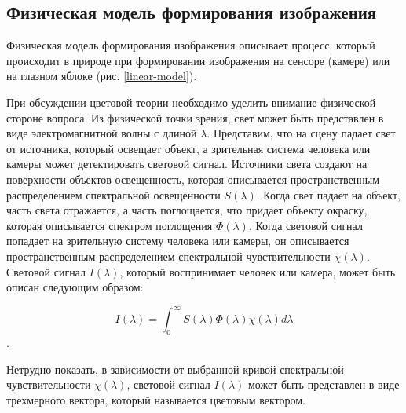 \subsection{Физическая модель формирования изображения}\label{sect-1-1}

Физическая модель формирования изображения \cite{lib-maximov} описывает процесс, который происходит в природе при формировании изображения на сенсоре (камере) или на глазном яблоке (рис. \ref{linear-model}).


При обсуждении цветовой теории необходимо уделить внимание физической стороне вопроса. Из физической точки зрения, свет может быть представлен в виде электромагнитной волны с длиной $\lambda$. Представим, что на сцену падает свет от источника, который освещает объект, а зрительная система человека или камеры может детектировать световой сигнал. Источники света создают на поверхности объектов освещенность, которая описывается пространственным распределением спектральной освещенности $S(\lambda)$. Когда свет падает на объект, часть света отражается, а часть поглощается, что придает объекту окраску, которая описывается спектром поглощения $\Phi(\lambda)$. Когда световой сигнал попадает на зрительную систему человека или камеры, он описывается пространственным распределением спектральной чувствительности $\chi(\lambda)$. Световой сигнал $I(\lambda)$, который воспринимает человек или камера, может быть описан следующим образом:

\begin{equation}
\label{eq:1-1-1}
I(\lambda) = \int_{0}^{\infty} S(\lambda) \Phi(\lambda) \chi(\lambda) d\lambda
\end{equation}.

Нетрудно показать, в зависимости от выбранной кривой спектральной чувствительности $\chi(\lambda)$, световой сигнал $I(\lambda)$ может быть представлен в виде трехмерного вектора, который называется цветовым вектором.
